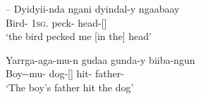 \documentclass{langscibook}
\begin{document}
--
\ea\label{ex:key:2-15}
\gll Dyidyii-nda ngani dyindal-y ngaabaay\\
Bird- 1\textsc{sg}. peck- head-[]\\
\glt `the bird pecked me [in the] head' \\
\citep[58]{haviland_guugu_1979}
\z

\ea\label{ex:key:2-16}
\gll Yarrga-aga-mu-n gudaa gunda-y biiba-ngun\\
Boy--mu-	dog-[] hit- father-\\
\glt `The boy’s father hit the dog' \\
\citep[57]{haviland_guugu_1979}
\z
\end{document}
